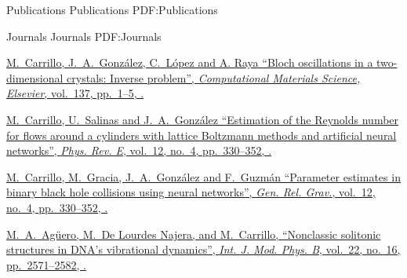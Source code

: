 \documentclass[letterpaper,MMMyyyy,nonstopmode]{simpleresumecv}
\begin{document}
\begin{Body}


\Section
{Publications}
{Publications}
{PDF:Publications}

\SubSection
{Journals}
{Journals}
{PDF:Journals}

\begingroup

\Gap
\NumberedItem{[1]}
\href{https://doi.org/10.1016/j.commatsci.2017.04.030}
{\underline{M.~Carrillo}, J.~A.~Gonz\'alez, C.~L\'opez and A. Raya
``Bloch oscillations in a two-dimensional crystals: Inverse problem'',
\textit{Computational Materials Science, Elsevier},
vol.~137,
pp.~1--5,
.}


\Gap
\NumberedItem{[2]}
\href{https://doi.org/10.1103/PhysRevE.94.063304}
{\underline{M.~Carrillo}, U.~Salinas and J.~A.~Gonz\'alez
``Estimation of the Reynolds number for flows around a cylinders with lattice Boltzmann methods and artificial neural networks'',
\textit{Phys. Rev. E},
vol.~12,
no.~4,
pp.~330--352,
.}

\Gap
\NumberedItem{[3]}
\href{https://link.springer.com/article/10.1007/s10714-016-2136-0}
{\underline{M.~Carrillo}, M.~Gracia, J.~A.~Gonz\'alez and F.~Guzm\'an
``Parameter estimates in binary black hole collisions using neural networks'',
\textit{Gen. Rel. Grav.},
vol.~12,
no.~4,
pp.~330--352,
.}

\Gap
\NumberedItem{[4]}
\href{http://dx.doi.org/10.1142/S021797920803968X}
{M.~A.~Ag\"uero, M.~De Lourdes Najera, and \underline{M.~Carrillo},
``Nonclassic solitonic structures in DNA's vibrational dynamics'',
\textit{Int. J. Mod. Phys. B},
vol.~22,
no.~16,
pp.~2571--2582,
.}

\endgroup

\BigGap



\end{Body}
\end{document}
